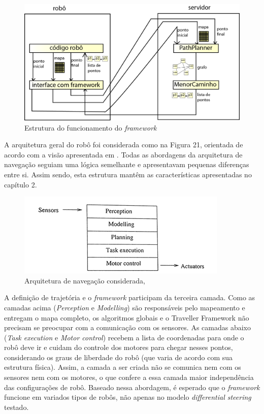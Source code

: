 \begin{figure}[h]
	\centering
	\label{fig20}
		\includegraphics[keepaspectratio=true,scale=0.9]{figuras/framework.png}
	\caption{Estrutura do funcionamento do \textit{framework}}
\end{figure} 

A arquitetura geral do robô foi considerada como na Figura 21, orientada de acordo com a visão apresentada em \cite{Nehmzow2003}. Todas as abordagens da arquitetura de navegação seguiam uma lógica semelhante e apresentavam pequenas diferenças entre si. Assim sendo, esta estrutura mantêm as características apresentadas no capítulo 2.

\begin{figure}[h]
	\centering
	\label{fig21}
		\includegraphics[keepaspectratio=true,scale=1]{figuras/arqusada.jpg}
	\caption{Arquitetura de navegação considerada, \cite{Nehmzow2003}}
\end{figure}

A definição de trajetória e o \textit{framework} participam da terceira camada. Como as camadas acima (\textit{Perception} e \textit{Modelling}) são responsáveis pelo mapeamento e entregam o mapa completo, os algoritmos globais e o Traveller Framework não precisam se preocupar com a comunicação com os sensores. As camadas abaixo (\textit{Task execution} e \textit{Motor control}) recebem a lista de coordenadas para onde o robô deve ir e cuidam do controle dos motores para chegar nesses pontos, considerando os graus de liberdade do robô (que varia de acordo com sua estrutura física). Assim, a camada a ser criada não se comunica nem com os sensores nem com os motores, o que confere a essa camada maior independência das configurações de robô. Baseado nessa abordagem, é esperado que o \textit{framework} funcione em variados tipos de robôs, não apenas no modelo \textit{differential steering} testado.

